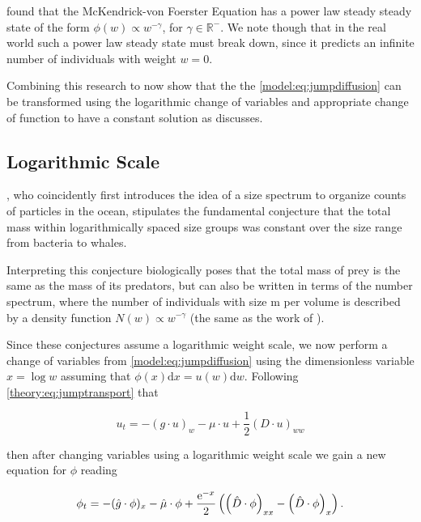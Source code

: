 \documentclass[../main]{subfiles}
\begin{document}
  \cite{benoit2004} found that the McKendrick-von Foerster Equation has a power law steady steady state of the form $\phi(w) \propto w^{-\gamma}$, for $\gamma \in \mathbb{R}^-$. We note though that in the real world such a power law steady state must break down, since it predicts an infinite number of individuals with weight $w = 0$.

  Combining this research to now show that the the \autoref{model:eq:jumpdiffusion} can be transformed using the logarithmic change of variables and appropriate change of function to have a constant solution as \cite{benoit2004} discusses.

  \subsection{Logarithmic Scale}
  \cite{sheldon1967}, who coincidently first introduces the idea of a size spectrum to organize counts of particles in the ocean, stipulates the fundamental conjecture that the total mass within logarithmically spaced size groups was constant over the size range from bacteria to whales.

  Interpreting this conjecture biologically \cite{silvert1980} poses that the total mass of prey is the same as the mass of its predators, but can also be written in terms of the number spectrum, where the number of individuals with size m per volume is described by a density function $N(w) \propto w^{-\gamma}$ (the same as the work of \cite{benoit2004}).

  Since these conjectures assume a logarithmic weight scale, we now perform a change of variables from \autoref{model:eq:jumpdiffusion} using the dimensionless variable $x = \log{w}$ assuming that $\phi(x) \mathrm{d}x = u(w) \mathrm{d}w$. Following \autoref{theory:eq:jumptransport} that

  \begin{equation}
    u_t = - (g \cdot u)_w - \mu \cdot u + \frac{1}{2} (D \cdot u)_{ww}
  \end{equation}

  then after changing variables using a logarithmic weight scale we gain a new equation for $\phi$ reading

  \begin{equation} \label{model:eq:logscale}
    \phi_t = - (\hat{g} \cdot \phi)_x - \hat{\mu} \cdot \phi + \frac{\operatorname{e}^{-x}}{2} \left( \left( \hat{D} \cdot \phi \right)_{xx} - \left( \hat{D} \cdot \phi \right)_x \right).
  \end{equation}
\end{document}
